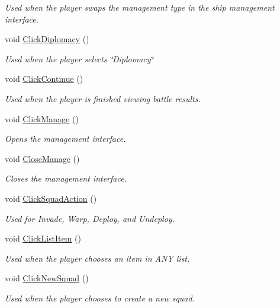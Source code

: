 \begin{DoxyCompactItemize}
\begin{DoxyCompactList}\small\item\em Used when the player swaps the management type in the ship management interface. \end{DoxyCompactList}\item 
void \hyperlink{class_custom_u_i_a8bec57568ef2193338779f7f6d60a8c3}{Click\+Diplomacy} ()
\begin{DoxyCompactList}\small\item\em Used when the player selects \char`\"{}\+Diplomacy\char`\"{} \end{DoxyCompactList}\item 
void \hyperlink{class_custom_u_i_ab048f1d55dd2f1afa4cb095fab454348}{Click\+Continue} ()
\begin{DoxyCompactList}\small\item\em Used when the player is finished viewing battle results. \end{DoxyCompactList}\item 
void \hyperlink{class_custom_u_i_a28102d597b71b025765a4aa81ebe2649}{Click\+Manage} ()
\begin{DoxyCompactList}\small\item\em Opens the management interface. \end{DoxyCompactList}\item 
void \hyperlink{class_custom_u_i_a69b3787fb869d43af6eb6fa06c6d7f50}{Close\+Manage} ()
\begin{DoxyCompactList}\small\item\em Closes the management interface. \end{DoxyCompactList}\item 
void \hyperlink{class_custom_u_i_aee924b380203a76265712b3095a8df56}{Click\+Squad\+Action} ()
\begin{DoxyCompactList}\small\item\em Used for Invade, Warp, Deploy, and Undeploy. \end{DoxyCompactList}\item 
void \hyperlink{class_custom_u_i_a48e6791d580bb0cb5e00c814d3ed1dc4}{Click\+List\+Item} ()
\begin{DoxyCompactList}\small\item\em Used when the player chooses an item in A\+N\+Y list. \end{DoxyCompactList}\item 
void \hyperlink{class_custom_u_i_a378850cbf359fd0735e6e46eb5fa523a}{Click\+New\+Squad} ()
\begin{DoxyCompactList}\small\item\em Used when the player chooses to create a new squad. \end{DoxyCompactList}\item 

\end{DoxyCompactItemize}
